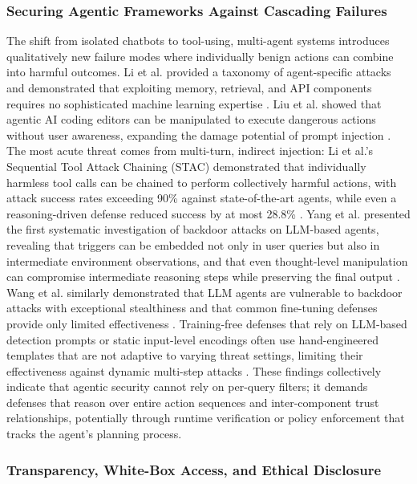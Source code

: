 \documentclass[11pt,a4paper]{article}
\begin{document}
\subsubsection{Securing Agentic Frameworks Against Cascading Failures}

The shift from isolated chatbots to tool-using, multi-agent systems introduces qualitatively new failure modes where individually benign actions can combine into harmful outcomes. Li et al. provided a taxonomy of agent-specific attacks and demonstrated that exploiting memory, retrieval, and API components requires no sophisticated machine learning expertise \cite{Li_2025_LLM_6131fb27}. Liu et al. showed that agentic AI coding editors can be manipulated to execute dangerous actions without user awareness, expanding the damage potential of prompt injection \cite{Liu_2025_AI_ed04df60}. The most acute threat comes from multi-turn, indirect injection: Li et al.'s Sequential Tool Attack Chaining (STAC) demonstrated that individually harmless tool calls can be chained to perform collectively harmful actions, with attack success rates exceeding 90\% against state-of-the-art agents, while even a reasoning-driven defense reduced success by at most 28.8\% \cite{Li_2025_LLM_c2206a72}. Yang et al. presented the first systematic investigation of backdoor attacks on LLM-based agents, revealing that triggers can be embedded not only in user queries but also in intermediate environment observations, and that even thought-level manipulation can compromise intermediate reasoning steps while preserving the final output \cite{Yang_2024_LLM_eba70536}. Wang et al. similarly demonstrated that LLM agents are vulnerable to backdoor attacks with exceptional stealthiness and that common fine-tuning defenses provide only limited effectiveness \cite{Wang_2024_LLM_7c0f7746}. Training-free defenses that rely on LLM-based detection prompts or static input-level encodings often use hand-engineered templates that are not adaptive to varying threat settings, limiting their effectiveness against dynamic multi-step attacks \cite{Liu_2025_Aegis_6081be1b}. These findings collectively indicate that agentic security cannot rely on per-query filters; it demands defenses that reason over entire action sequences and inter-component trust relationships, potentially through runtime verification or policy enforcement that tracks the agent's planning process.

\subsubsection{Transparency, White-Box Access, and Ethical Disclosure}
\end{document}
